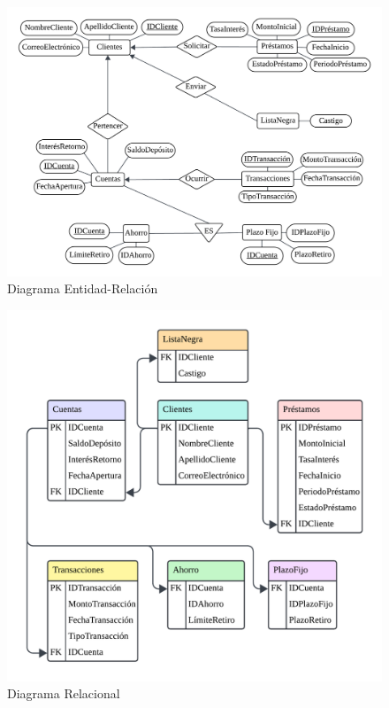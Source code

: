 \begin{figure}[H]
  \centering
  \includegraphics[scale = 0.2]{Imagenes/Diagramas/DERE.png}
  \caption{Diagrama Entidad-Relación}
\end{figure}

\begin{figure}[H]
  \centering
  \includegraphics[scale = 0.3]{Imagenes/Diagramas/DR.png}
  \caption{Diagrama Relacional}
\end{figure}